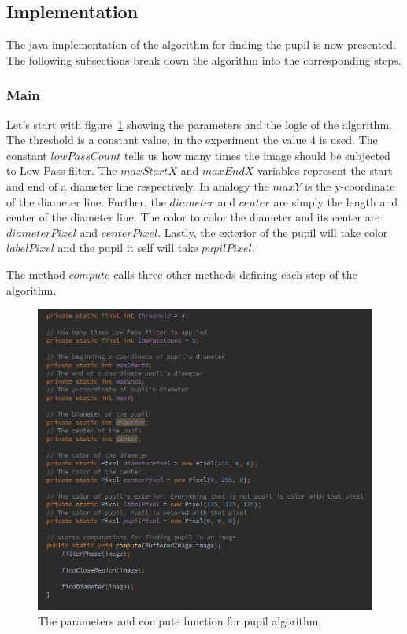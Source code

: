\documentclass{article}
\begin{document}
\subsection{Implementation}
The java implementation of the algorithm for finding the pupil is now presented. The following subsections break down the algorithm into the corresponding steps.

\subsubsection{Main}


Let's start with figure~\ref{fig:pup_alg_compute} showing the parameters and the logic of the algorithm. The threshold is a constant value, in the experiment the value 4 is used. The constant $lowPassCount$ tells us how many times the image should be subjected to Low Pass filter. The $maxStartX$ and $maxEndX$ variables represent the start and end of a diameter line respectively. In analogy the $maxY$ is the y-coordinate of the diameter line. Further, the $diameter$ and $center$ are simply the length and center of the diameter line. The color to color the diameter and its center are $diameterPixel$ and $centerPixel$. Lastly, the exterior of the pupil will take color $labelPixel$ and the pupil it self will take $pupilPixel$.

The method $compute$ calls three other methods defining each step of the algorithm.

%
%
\begin{figure}[H]
\centering

  \includegraphics[width=0.9\linewidth]{res/pupil/alg/compute.png}

\caption{The parameters and compute function for pupil algorithm}
\label{fig:pup_alg_compute}
\end{figure}
\end{document}
